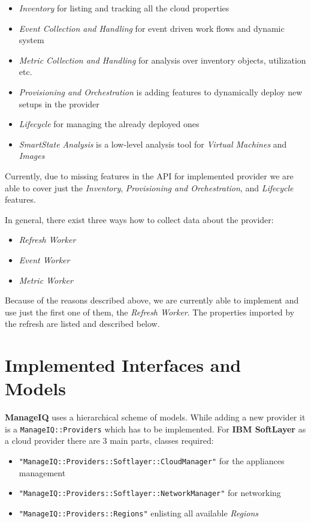 \begin{itemize}
	\item \emph{Inventory} for listing and tracking all the cloud properties
	\item \emph{Event Collection and Handling} for event driven work flows and dynamic system
	\item \emph{Metric Collection and Handling} for analysis over inventory objects, utilization etc.
	\item \emph{Provisioning and Orchestration} is adding features to dynamically deploy new setups in the provider
	\item \emph{Lifecycle} for managing the already deployed ones
	\item \emph{SmartState Analysis} is a low-level analysis tool for \emph{Virtual Machines} and \emph{Images}
\end{itemize}

Currently, due to missing features in the API for implemented provider we are able to cover just the \emph{Inventory}, \emph{Provisioning and Orchestration}, and \emph{Lifecycle} features.

In general, there exist three ways how to collect data about the provider:

\begin{itemize}
	\item \emph{Refresh Worker}
	\item \emph{Event Worker}
	\item \emph{Metric Worker}
\end{itemize}

Because of the reasons described above, we are currently able to implement and use just the first one of them, the \emph{Refresh Worker}. The properties imported by the refresh are listed and described below.

\section{Implemented Interfaces and Models}
\label{sec:Implemented Interfaces and Models}

\textbf{ManageIQ} uses a hierarchical scheme of models. While adding a new provider it is a \verb|ManageIQ::Providers| which has to be implemented. For \textbf{IBM SoftLayer} as a cloud provider there are 3 main parts, classes required:

\begin{itemize}
	\item \verb|"ManageIQ::Providers::Softlayer::CloudManager"| for the appliances management
	\item \verb|"ManageIQ::Providers::Softlayer::NetworkManager"| for networking
	\item \verb|"ManageIQ::Providers::Regions"| enlisting all available \emph{Regions}
\end{itemize}


